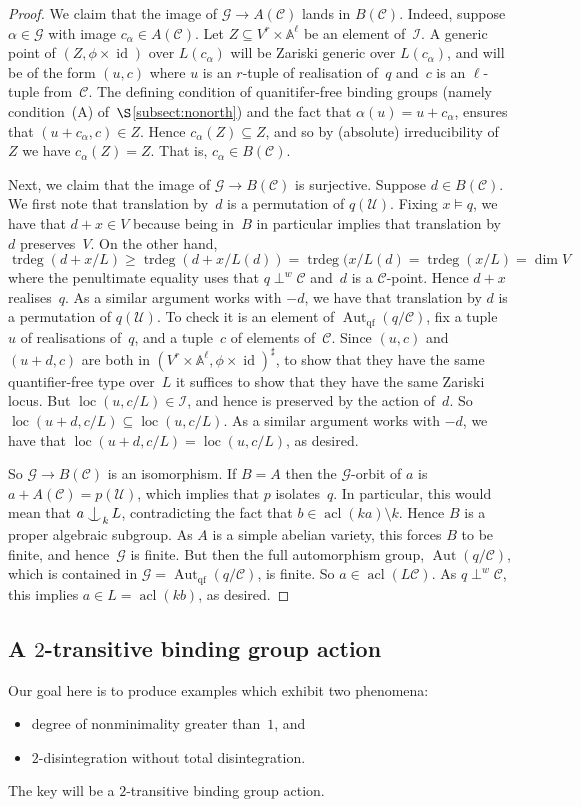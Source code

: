 \documentclass[\DocOpts]{amsart}
\theoremstyle{definition}
\def\qf{\operatorname{qf}}
\def\acl{\operatorname{acl}}
\def\aut{\operatorname{Aut}}
\def\loc{\operatorname{loc}}
\def\trdeg{\operatorname{trdeg}}
\def\C{\mathcal{C}}
\def\G{\mathcal{G}}
\def\U{\mathcal{U}}
\def\I{\mathcal{I}}
\renewcommand{\AA}{\mathbb{A}}
\providecommand{\id}{\operatorname{id}}
\newcommand{\<}{\langle}
\renewcommand{\>}{\rangle}
\def\Ind#1#2{#1\setbox0=\hbox{\(#1x\)}\kern\wd0\hbox to 
0pt{\hss\(#1\mid\)\hss}\lower.9\ht0\hbox to 
0pt{\hss\(#1\smile\)\hss}\kern\wd0}
\def\ind{\mathop{\mathpalette\Ind{}}}
\begin{document}
\begin{proof}
We claim that the image of $\G\to A(\C)$ lands in $B(\C)$.
Indeed, suppose $\alpha\in\G$ with image $c_\alpha\in A(\C)$.
Let $Z\subseteq V^r\times\AA^\ell$ be an element of~$\I$.
A generic point of $(Z,\phi\times\id)$ over $L(c_\alpha)$ will be Zariski generic over $L(c_\alpha)$, and will be of the form $(u,c)$ where $u$ is an $r$-tuple of realisation of~$q$ and~$c$ is an $\ell$-tuple from~$\C$.
The defining condition of quanitifer-free binding groups (namely condition~(A) of~$\S$\ref{subsect:nonorth}) and the fact that $\alpha(u)=u+c_\alpha$, ensures that $(u+c_\alpha,c)\in Z$.
Hence $c_\alpha(Z)\subseteq Z$, and so by (absolute) irreducibility of~$Z$ we have $c_\alpha(Z)= Z$.
That is, $c_\alpha\in B(\C)$.

Next, we claim that the image of $\G\to B(\C)$ is surjective.
Suppose $d\in B(\C)$.
We first note that translation by~$d$ is a permutation of $q(\U)$.
Fixing $x\models q$, we have that $d+x\in V$ because being in~$B$ in particular implies that translation by~$d$ preserves~$V$.
On the other hand,
$$\trdeg(d+x/L)\geq \trdeg(d+x/L(d))=\trdeg(x/L(d)=\trdeg(x/L)=\dim V$$
where the penultimate equality uses that $q\perp^w\C$ and~$d$ is a $\C$-point.
Hence $d+x$ realises~$q$.
As a similar argument works with $-d$, we have that translation by $d$ is a permutation of $q(\U)$.
To check it is an element of $\aut_{\qf}(q/\C)$, fix a tuple~\(u\) of realisations of~\(q\), and a tuple~\(c\) of elements of~\(\C\).
Since $(u,c)$ and $(u+d,c)$ are both in $(V^r\times\AA^\ell, \phi\times\id)^\sharp$, to show that they have the same quantifier-free type over~$L$ it suffices to show that they have the same Zariski locus.
But $\loc(u,c/L)\in\I$, and hence is preserved by the action of~$d$.
So $\loc(u+d,c/L)\subseteq \loc(u,c/L)$.
As a similar argument works with $-d$, we have that $\loc(u+d,c/L)=\loc(u,c/L)$, as desired.

So $\G\to B(\C)$ is an isomorphism.
If $B=A$ then the $\G$-orbit of $a$ is $a+A(\C)=p(\U)$, which implies that $p$ isolates~$q$.
In particular, this would mean that $a\ind_kL$, contradicting the fact that $b\in\acl(ka)\setminus k$.
Hence $B$ is a proper algebraic subgroup.
As $A$ is a simple abelian variety, this forces $B$ to be finite, and hence~$\G$ is finite.
But then the full automorphism group, $\aut(q/\C)$, which is contained in $\G=\aut_{\qf}(q/\C)$, is finite.
So $a\in\acl(L\C)$.
As $q\perp^w\C$, this implies $a\in L=\acl(kb)$, as desired.
\end{proof}

\medskip
\subsection{A $2$-transitive binding group action}
\label{sec-2trans}
Our goal here is to produce examples which exhibit two phenomena:
\begin{itemize}
\item
degree of nonminimality greater than~$1$, and 
\item
$2$-disintegration without total disintegration.
\end{itemize}
The key will be a $2$-transitive binding group action.
\end{document}
